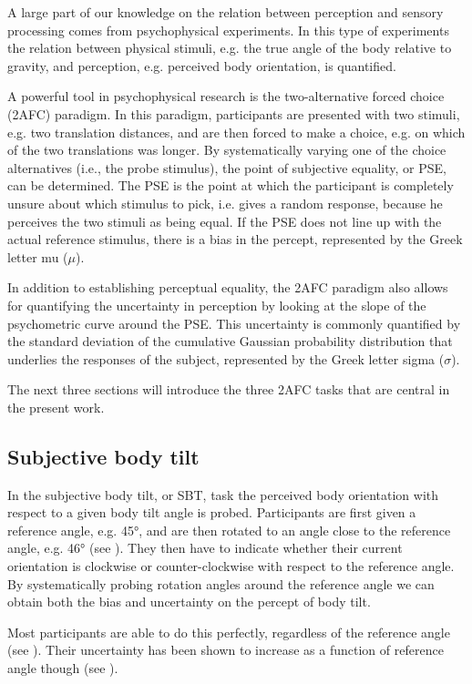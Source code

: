 A large part of our knowledge on the relation between perception and sensory processing comes from psychophysical experiments. In this type of experiments the relation between physical stimuli, e.g. the true angle of the body relative to gravity, and perception, e.g. perceived body orientation, is quantified.

A powerful tool in psychophysical research is the two-alternative forced choice (2AFC) paradigm. In this paradigm, participants are presented with two stimuli, e.g. two translation distances, and are then forced to make a choice, e.g. on which of the two translations was longer. By systematically varying one of the choice alternatives (i.e., the probe stimulus), the point of subjective equality, or PSE, can be determined. The PSE is the point at which the participant is completely unsure about which stimulus to pick, i.e. gives a random response, because he perceives the two stimuli as being equal. If the PSE does not line up with the actual reference stimulus, there is a bias in the percept, represented by the Greek letter mu ($\mu$).

In addition to establishing perceptual equality, the 2AFC paradigm also allows for quantifying the uncertainty in perception by looking at the slope of the psychometric curve around the PSE. This uncertainty is commonly quantified by the standard deviation of the cumulative Gaussian probability distribution that underlies the responses of the subject, represented by the Greek letter sigma ($\sigma$).

The next three sections will introduce the three 2AFC tasks that are central in the present work.

\subsection{Subjective body tilt}
In the subjective body tilt, or SBT, task the perceived body orientation with respect to a given body tilt angle is probed. Participants are first given a reference angle, e.g. 45\si{\degree}, and are then rotated to an angle close to the reference angle, e.g. 46\si{\degree} (see ). They then have to indicate whether their current orientation is clockwise or counter-clockwise with respect to the reference angle. By systematically probing rotation angles around the reference angle we can obtain both the bias and uncertainty on the percept of body tilt.

Most participants are able to do this perfectly, regardless of the reference angle (see ). Their uncertainty has been shown to increase as a function of reference angle though (see ).

